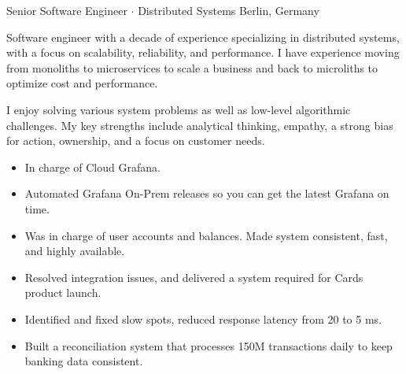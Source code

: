 \documentclass[a4paper,10pt]{article}
\begin{document}
    {Senior Software Engineer $\cdot$ Distributed Systems}
    {Berlin, Germany}

    \begin{lede}
        Software engineer with a decade of experience specializing in distributed systems, with a focus on
        scalability, reliability, and performance. I have experience moving from monoliths to microservices
        to scale a business and back to microliths to optimize cost and performance.

        \vspace{5pt}
        I enjoy solving various system problems as well as low-level algorithmic challenges. My key strengths
        include analytical thinking, empathy, a strong bias for action, ownership, and a focus on customer needs.
    \end{lede}

    \begin{skills}
    \end{skills}


    \begin{itemize}
        \item In charge of Cloud Grafana.
        \item Automated Grafana On-Prem releases so you can get the latest Grafana on time.
    \end{itemize}

    \begin{itemize}
        \item Was in charge of user accounts and balances.
        Made system consistent, fast, and highly available.
        \item Resolved integration issues, and delivered a system required for Cards product launch.
        \item Identified and fixed slow spots, reduced response latency from 20 to 5 ms.
        \item Built a reconciliation system that processes 150M transactions daily to keep banking data consistent.
    \end{itemize}
\end{document}
